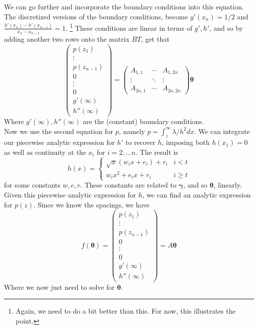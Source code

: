 \documentclass{article}
\newcommand{\bs}{\boldsymbol}                               %
\begin{document}
We can go further and incorporate the boundary conditions into this equation. 
The discretized versions of the boundary conditions, become
$g'(x_n)=1/2$ and $\displaystyle \frac{h'(x_n)-h'(x_{n-1})}{x_n-x_{n-1}} = 1$.
\footnote{Again, we need to do a bit better than this. For now, this 
illustrates the point.}
These conditions are linear in terms of $g',h'$, and so by adding another two 
rows onto the matrix $BT$, get that
\[ \left( \begin{array}{c} p(z_1) \\ \vdots \\ p(z_{n-1}) \\[4pt] 0 \\ \vdots \\
0 \\ g'(\infty) \\ h''(\infty) \end{array} \right) =
\left( \begin{array}{ccc} A_{1,1} & \cdots & A_{1 , 2n} \\
\vdots & \ddots & \vdots \\ A_{2n,1} & \cdots & A_{2n , 2n} 
\end{array}
\right) \bs{\theta}\]
Where $g'(\infty), h''(\infty)$ are the (constant) boundary conditions. 
\\

Now we use the second equation for $p$, namely $p=\int_z^{\infty} 
\lambda/h^2 dx$. We can integrate our piecewise analytic expression
for $h'$ to recover $h$, imposing both $h(x_1)=0$ as well as continuity at the
$x_i$ for $i=2,\dots n$. The result is 
\[ h(x) = \left\{ \begin{array}{cc} \sqrt{x}(w_ix+e_i)+r_i &
i <t \\ w_ix^2+e_ix + r_i & i \geq t \end{array} \right. \]
for some constants $w,e,r$. These constants are related to $\bs{\gamma}$,
and so $\bs{\theta}$, linearly. Given this piecewise analytic expression
for $h$, we can find an analytic expression for $p(z)$. Since we know the
spacings, we have
\[ f(\bs{\theta}) = \left( \begin{array}{c} p(z_1) \\ \vdots \\ p(z_{n-1}) 
\\[4pt] 0 \\ \vdots \\ 0 \\ g'(\infty) \\ h''(\infty) \end{array} \right) =
 A  \bs{\theta} \]
Where we now just need to solve for $\bs{\theta}$.
\end{document}
